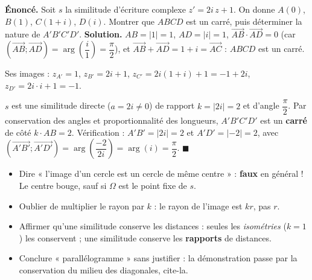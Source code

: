 \documentclass[11pt]{article}
\begin{document}
\begin{exoresolu}
\textbf{Énoncé.} Soit $s$ la similitude d'écriture complexe $z' = 2i\,z + 1$. On donne $A(0)$, $B(1)$, $C(1+i)$, $D(i)$. Montrer que $ABCD$ est un carré, puis déterminer la nature de $A'B'C'D'$.
\tcblower
\textbf{Solution.} $AB = |1| = 1$, $AD = |i| = 1$, $\overrightarrow{AB} \cdot \overrightarrow{AD} = 0$ (car $(\overrightarrow{AB};\overrightarrow{AD}) = \operatorname{arg}\!\left(\dfrac{i}{1}\right) = \dfrac{\pi}{2}$), et $\overrightarrow{AB} + \overrightarrow{AD} = 1 + i = \overrightarrow{AC}$ : $ABCD$ est un carré.

Ses images : $z_{A'} = 1$, $z_{B'} = 2i + 1$, $z_{C'} = 2i(1+i) + 1 = -1 + 2i$, $z_{D'} = 2i \cdot i + 1 = -1$.

$s$ est une similitude directe ($a = 2i \neq 0$) de rapport $k = |2i| = 2$ et d'angle $\dfrac{\pi}{2}$. Par conservation des angles et proportionnalité des longueurs, $A'B'C'D'$ est un \textbf{carré} de côté $k \cdot AB = 2$. Vérification : $A'B' = |2i| = 2$ et $A'D' = |-2| = 2$, avec $(\overrightarrow{A'B'};\overrightarrow{A'D'}) = \operatorname{arg}\!\left(\dfrac{-2}{2i}\right) = \operatorname{arg}(i) = \dfrac{\pi}{2}$. \hfill $\blacksquare$
\end{exoresolu}

\begin{attention}
\begin{itemize}
\item Dire « l'image d'un cercle est un cercle de même centre » : \textbf{faux} en général ! Le centre bouge, sauf si $\Omega$ est le point fixe de $s$.
\item Oublier de multiplier le rayon par $k$ : le rayon de l'image est $kr$, pas $r$.
\item Affirmer qu'une similitude conserve les distances : seules les \emph{isométries} ($k = 1$) les conservent ; une similitude conserve les \textbf{rapports} de distances.
\item Conclure « parallélogramme » sans justifier : la démonstration passe par la conservation du milieu des diagonales, cite-la.
\end{itemize}
\end{attention}
\end{document}
